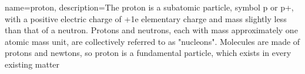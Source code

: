 
{
    name=proton,
    description={The proton is a subatomic particle, symbol p or p+, with a positive electric charge of +1e elementary charge and mass slightly less than that of a neutron. Protons and neutrons, each with mass approximately one atomic mass unit, are collectively referred to as "nucleons". Molecules are made of protons and newtons, so proton is a fundamental particle, which exists in every existing matter}
}
